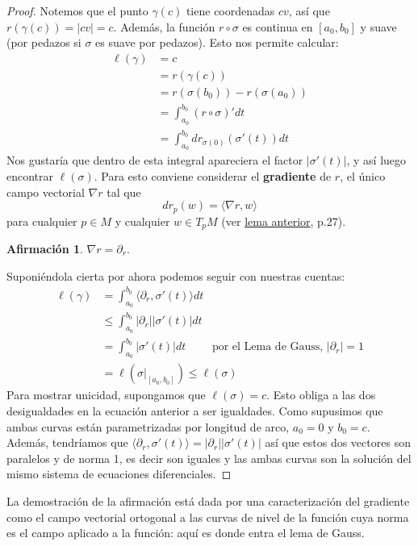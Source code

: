 \documentclass[spanish]{book}
\theoremstyle{definition}
\newtheorem*{af}{Afirmación}
\begin{document}
\begin{proof}
		Notemos que el punto $\gamma(c)$ tiene coordenadas $cv$, así que $r(\gamma(c))=|cv|=c$. Además, la función $r\circ\sigma$ es continua en $[a_0,b_0]$ y suave (por pedazos si $\sigma$ es suave por pedazos). Esto nos permite calcular:
		\begin{align*}
			\ell(\gamma)&=c\\
			&=r(\gamma(c))\\
			&=r(\sigma(b_0))-r(\sigma(a_0))\\
			&=\int_{a_0}^{b_0}(r\circ\sigma)' dt\\
			&=\int_{a_0}^{b_0}dr_{\sigma(0)}(\sigma'(t))dt
		\end{align*}
		Nos gustaría que dentro de esta integral apareciera el factor $|\sigma'(t)|$, y así luego encontrar $\ell(\sigma)$. Para esto conviene considerar el \textbf{gradiente} de $r$, el único campo vectorial $\nabla r$ tal que
		\[dr_p(w)=\langle \nabla r,w\rangle\]
		para cualquier $p\in M$ y cualquier $w\in T_pM$ (ver \hyperref[lem:camp-vect-unico]{lema anterior}, \cite{Lee-riem} p.27).
		\begin{af} $\nabla r=\partial_r$.
		\end{af}
		Suponiéndola cierta por ahora podemos seguir con nuestras cuentas:
		\begin{align*}
			\ell(\gamma)&=\int_{a_0}^{b_0}\langle\partial_r,\sigma'(t)\rangle dt\\
			&\leq\int_{a_0}^{b_0}|\partial_r||\sigma'(t)|dt\\
			&=\int_{a_0}^{b_0}|\sigma'(t)|dt\qquad\text{ por el Lema de Gauss, }|\partial_r|=1\\
			&=\ell(\sigma|_{[a_0,b_0]})\leq\ell(\sigma)
		\end{align*}
		Para mostrar unicidad, supongamos que $\ell(\sigma)=c$. Esto obliga a las dos desigualdades en la ecuación anterior a ser igualdades. Como supusimos que ambas curvas están parametrizadas por longitud de arco, $a_0=0$ y $b_0=c$. Además, tendríamos que $\langle \partial_r,\sigma'(t)\rangle=|\partial_r||\sigma'(t)|$ así que estos dos vectores son paralelos y de norma 1, es decir son iguales y las ambas curvas son la solución del mismo sistema de ecuaciones diferenciales.
		

	\end{proof}
	
	La demostración de la afirmación está dada por una caracterización del gradiente como el campo vectorial ortogonal a las curvas de nivel de la función cuya norma es el campo aplicado a la función: aquí es donde entra el lema de Gauss.
	
\end{document}

